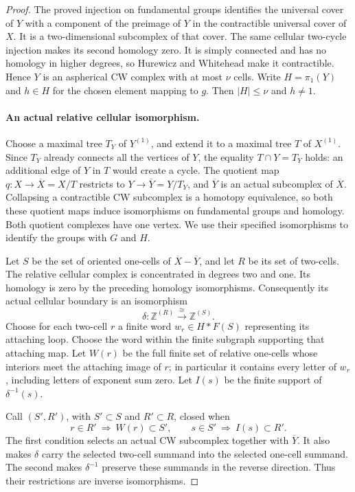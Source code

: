 \begin{proof}
The proved injection on fundamental groups identifies the
universal cover of $Y$ with a component of the preimage of $Y$
in the contractible universal cover of $X$. It is a
two-dimensional subcomplex of that cover. The same cellular
two-cycle injection makes its second homology zero. It is
simply connected and has no homology in higher degrees, so
Hurewicz and Whitehead make it contractible. Hence $Y$ is an
aspherical CW complex with at most $\nu$ cells. Write
$H=\pi_1(Y)$ and $h\in H$ for the chosen element mapping to
$g$. Then $|H|\leq\nu$ and $h\ne1$.

\paragraph{An actual relative cellular isomorphism.}
Choose a maximal tree $T_Y$ of $Y^{(1)}$, and extend it to a
maximal tree $T$ of $X^{(1)}$. Since $T_Y$ already connects
all the vertices of $Y$, the equality $T\cap Y=T_Y$ holds:
an additional edge of $Y$ in $T$ would create a cycle. The
quotient map $q:X\to\overline X=X/T$ restricts to
$Y\to\overline Y=Y/T_Y$, and $\overline Y$ is an actual
subcomplex of $\overline X$. Collapsing a contractible CW
subcomplex is a homotopy equivalence, so both these quotient
maps induce isomorphisms on fundamental groups and homology.
Both quotient complexes have one vertex. We use their
specified isomorphisms to identify the groups with $G$ and $H$.

Let $S$ be the set of oriented one-cells of
$\overline X-\overline Y$, and let $R$ be its set of two-cells.
The relative cellular complex is concentrated in degrees two
and one. Its homology is zero by the preceding homology
isomorphisms. Consequently its actual cellular boundary is
an isomorphism
\[
 \delta:\mathbb Z^{(R)}\xrightarrow{\ \cong\ }
                         \mathbb Z^{(S)}.
 \tag{A.19.4}
\]
Choose for each two-cell $r$ a finite word
$w_r\in H*F(S)$ representing its attaching loop. Choose the
word within the finite subgraph supporting that attaching
map. Let $W(r)$ be the full finite set of relative one-cells
whose interiors meet the attaching image of $r$; in particular it contains
every letter of $w_r$, including letters of exponent sum
zero. Let $I(s)$ be the finite support of $\delta^{-1}(s)$.

Call $(S',R')$, with $S'\subset S$ and $R'\subset R$, closed
when
\[
 r\in R'\ \Longrightarrow\ W(r)\subset S',
 \qquad
 s\in S'\ \Longrightarrow\ I(s)\subset R'.
 \tag{A.19.5}
\]
The first condition selects an actual CW subcomplex together
with $\overline Y$. It also makes $\delta$ carry the selected
two-cell summand into the selected one-cell summand. The
second makes $\delta^{-1}$ preserve these summands in the
reverse direction. Thus their restrictions are inverse
isomorphisms.


\end{proof}
